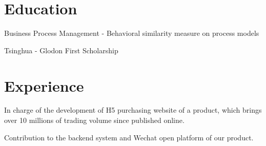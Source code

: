 \documentclass[a4paper]{resume-en}
\begin{document}
\begin{minipage}[t]{0.72\textwidth} %


\section{Education}

\vspace{\topsep}
\begin{tightitemize}
\item Business Process Management - Behavioral similarity measure on process models
\item Tsinghua - Glodon First Scholarship
\end{tightitemize}

\sectionspace



\sectionspace


\section{Experience}

\begin{tightitemize}
\item In charge of the development of H5 purchasing website of a product, which brings over 10 millions of trading volume since published online.
\item Contribution to the backend system and Wechat open platform of our product.
\end{tightitemize}


\end{minipage}
\end{document}
